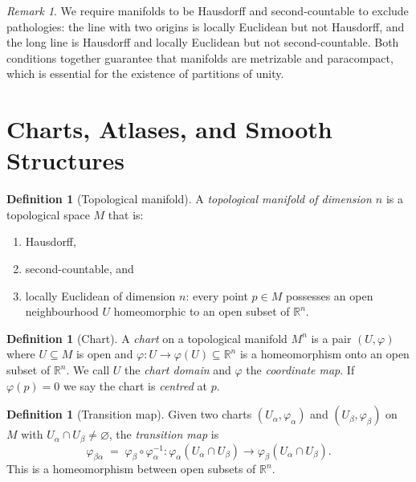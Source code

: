 \documentclass[12pt,a4paper,openany]{book}
\theoremstyle{definition}
\newtheorem{definition}[theorem]{Definition}
\theoremstyle{remark}
\newtheorem{remark}[theorem]{Remark}
\newcommand{\R}{\mathbb{R}}
\begin{document}
\begin{remark}\label{rem:why-hausdorff-second-countable}
We require manifolds to be Hausdorff and second-countable to exclude
pathologies: the line with two origins is locally Euclidean but not
Hausdorff, and the long line is Hausdorff and locally Euclidean but not
second-countable.  Both conditions together guarantee that manifolds are
metrizable and paracompact, which is essential for the existence of
partitions of unity.
\end{remark}

\section{Charts, Atlases, and Smooth Structures}
\label{sec:charts-atlases}

\begin{definition}[Topological manifold]\label{def:top-manifold}
A \emph{topological manifold of dimension $n$} is a topological space $M$
that is:
\begin{enumerate}[label=(\roman*)]
  \item Hausdorff,
  \item second-countable, and
  \item locally Euclidean of dimension $n$: every point $p \in M$ possesses
        an open neighbourhood $U$ homeomorphic to an open subset of $\R^n$.
\end{enumerate}
\end{definition}

\begin{definition}[Chart]\label{def:chart}
A \emph{chart} on a topological manifold $M^n$ is a pair $(U,\varphi)$
where $U \subseteq M$ is open and $\varphi \colon U \to \varphi(U)
\subseteq \R^n$ is a homeomorphism onto an open subset of $\R^n$.  We call
$U$ the \emph{chart domain} and $\varphi$ the
\emph{coordinate map}.  If $\varphi(p) = 0$ we say
the chart is \emph{centred} at $p$.
\end{definition}

\begin{definition}[Transition map]\label{def:transition}
Given two charts $(U_\alpha, \varphi_\alpha)$ and
$(U_\beta, \varphi_\beta)$ on $M$ with $U_\alpha \cap U_\beta \neq
\varnothing$, the \emph{transition map} is
\[
  \varphi_{\beta\alpha}
  \;=\;
  \varphi_\beta \circ \varphi_\alpha^{-1}
  \colon
  \varphi_\alpha(U_\alpha \cap U_\beta)
  \longrightarrow
  \varphi_\beta(U_\alpha \cap U_\beta).
\]
This is a homeomorphism between open subsets of $\R^n$.
\end{definition}
\end{document}
